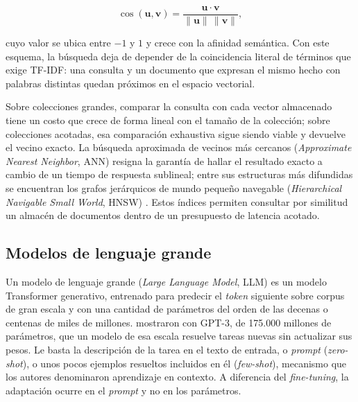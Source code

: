 \begin{equation}
  \cos(\mathbf{u}, \mathbf{v}) = \frac{\mathbf{u} \cdot \mathbf{v}}{\lVert \mathbf{u} \rVert \, \lVert \mathbf{v} \rVert},
  \label{eq:coseno}
\end{equation}

\noindent cuyo valor se ubica entre $-1$ y $1$ y crece con la afinidad semántica. Con este esquema, la búsqueda deja de depender de la coincidencia literal de términos que exige TF-IDF: una consulta y un documento que expresan el mismo hecho con palabras distintas quedan próximos en el espacio vectorial.

Sobre colecciones grandes, comparar la consulta con cada vector almacenado tiene un costo que crece de forma lineal con el tamaño de la colección; sobre colecciones acotadas, esa comparación exhaustiva sigue siendo viable y devuelve el vecino exacto. La búsqueda aproximada de vecinos más cercanos (\textit{Approximate Nearest Neighbor}, ANN) resigna la garantía de hallar el resultado exacto a cambio de un tiempo de respuesta sublineal; entre sus estructuras más difundidas se encuentran los grafos jerárquicos de mundo pequeño navegable (\textit{Hierarchical Navigable Small World}, HNSW) \parencite{MalkovYashunin2020}. Estos índices permiten consultar por similitud un almacén de documentos dentro de un presupuesto de latencia acotado.

\subsection{Modelos de lenguaje grande}
\label{sec:llm}

Un modelo de lenguaje grande (\textit{Large Language Model}, LLM) es un modelo Transformer generativo, entrenado para predecir el \textit{token} siguiente sobre corpus de gran escala y con una cantidad de parámetros del orden de las decenas o centenas de miles de millones. \textcite{BrownEtAl2020} mostraron con GPT-3, de 175.000 millones de parámetros, que un modelo de esa escala resuelve tareas nuevas sin actualizar sus pesos. Le basta la descripción de la tarea en el texto de entrada, o \textit{prompt} (\textit{zero-shot}), o unos pocos ejemplos resueltos incluidos en él (\textit{few-shot}), mecanismo que los autores denominaron aprendizaje en contexto. A diferencia del \textit{fine-tuning}, la adaptación ocurre en el \textit{prompt} y no en los parámetros.

